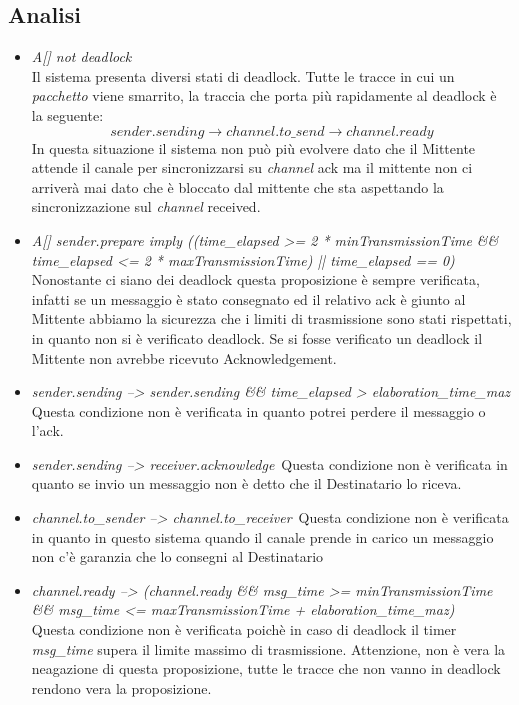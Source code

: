 \documentclass[a4paper]{article}
\newcommand{\channel}{\textit{channel }}
\newcommand{\pacchetto}{\textit{pacchetto }}
\begin{document}
\subsection{Analisi}
\begin{itemize}
	\item \textit{A[] not deadlock}\\
		Il sistema presenta diversi stati di deadlock. Tutte le tracce in cui un \pacchetto viene smarrito, la traccia che porta più rapidamente al deadlock è la seguente:
		$$ sender.sending \rightarrow channel.to\_send \rightarrow channel.ready $$
		In questa situazione il sistema non può più evolvere dato che il Mittente attende il canale per sincronizzarsi su \channel ack ma il mittente non ci arriverà mai dato che è bloccato dal mittente che sta aspettando la sincronizzazione sul \channel received.
	\item \textit{A[] sender.prepare imply ((time\_elapsed >= 2 * minTransmissionTime \&\& time\_elapsed <= 2 * maxTransmissionTime) || time\_elapsed == 0)}\\
		Nonostante ci siano dei deadlock questa proposizione è sempre verificata, infatti se un messaggio è stato consegnato ed il relativo ack è giunto al Mittente abbiamo la sicurezza che i limiti di trasmissione sono stati rispettati, in quanto non si è verificato deadlock.
		Se si fosse verificato un deadlock il Mittente non avrebbe ricevuto Acknowledgement.
	\item \textit{sender.sending --> sender.sending \&\& time\_elapsed > elaboration\_time\_maz}\\
		Questa condizione non è verificata in quanto potrei perdere il messaggio o l'ack.
	\item \textit{sender.sending --> receiver.acknowledge}\
		Questa condizione non è verificata in quanto se invio un messaggio non è detto che il Destinatario lo riceva.
	\item \textit{channel.to\_sender --> channel.to\_receiver}\
		Questa condizione non è verificata in quanto in questo sistema quando il canale prende in carico un messaggio non c'è garanzia che lo consegni al Destinatario
	\item \textit{channel.ready --> (channel.ready \&\& msg\_time >= minTransmissionTime \&\& msg\_time <= maxTransmissionTime + elaboration\_time\_maz)}\\
		Questa condizione non è verificata poichè in caso di deadlock il timer \textit{msg\_time} supera il limite massimo di trasmissione.
		Attenzione, non è vera la neagazione di questa proposizione, tutte le tracce che non vanno in deadlock rendono vera la proposizione.
\end{itemize}
\end{document}

